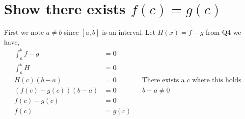 \documentclass{article}
\begin{document}
\section{Show there exists $f(c) = g(c)$}
First we note $a \neq b$ since $[a,b]$ is an interval.
Let $H(x) = f - g$ from Q4 we have,
\begin{align*}
    \int_a^b f - g &= 0 \\
    \int_a^b H &= 0 \\
    H(c)(b - a) &= 0 && \text{There exists a $c$ where this holds} \\
    (f(c) - g(c))(b - a) &= 0 && \text{$b - a \neq 0$} \\
    f(c) - g(c) &= 0 \\
    f(c) &= g(c) \\
\end{align*}
\end{document}

